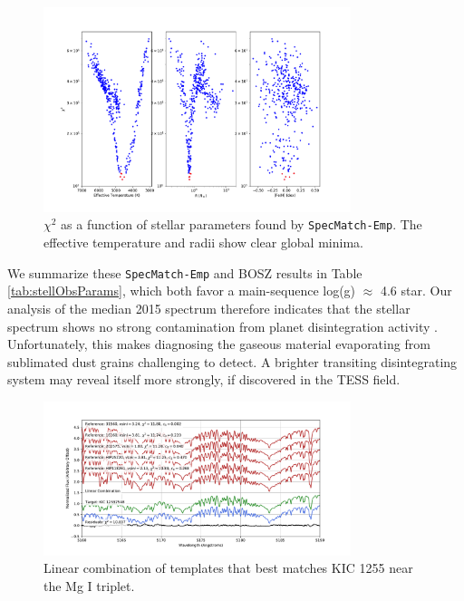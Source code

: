 \documentclass[preprint,trackchanges]{aastex61}
\begin{document}
\begin{figure}[!hbtp]
\begin{centering}
\includegraphics[width=0.8\textwidth]{spec_chi_min.pdf}
\caption{$\chi^2$ as a function of stellar parameters found by \texttt{SpecMatch-Emp}.
The effective temperature and radii show clear global minima.}\label{fig:SpecMatch-Emp}
\end{centering}
\end{figure}

We summarize these \texttt{SpecMatch-Emp} and BOSZ results in Table \ref{tab:stellObsParams}, which both favor a main-sequence log(g) $\approx$ 4.6 star.
Our analysis of the median 2015 spectrum therefore indicates that the stellar spectrum shows no strong contamination from planet disintegration activity .
Unfortunately, this makes diagnosing the gaseous material evaporating from sublimated dust grains challenging to detect.
A brighter transiting disintegrating system may reveal itself more strongly, if discovered in the TESS field.

\begin{figure}[!hbtp]
\begin{centering}
\includegraphics[width=0.8\textwidth]{lincomb_kic1255.pdf}
\caption{Linear combination of templates that best matches KIC 1255 near the Mg I triplet.}\label{fig:SpecMatch-EmpComb}
\end{centering}
\end{figure}
\end{document}
